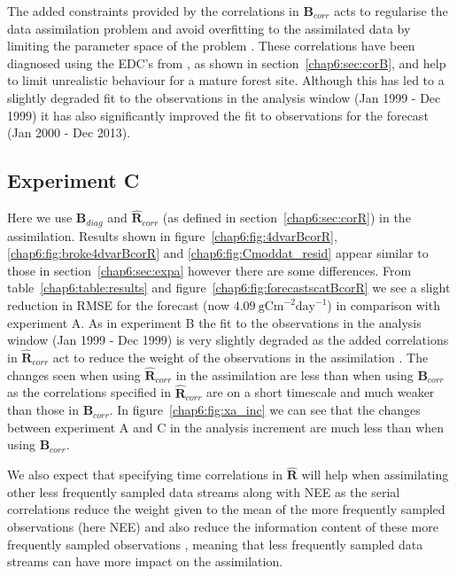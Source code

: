 The added constraints provided by the correlations in $\textbf{B}_{corr}$ acts to regularise the data assimilation problem and avoid overfitting to the assimilated data by limiting the parameter space of the problem \citep{smith2009variational}. These correlations have been diagnosed using the EDC's from \citet{Bloom2015}, as shown in section~\ref{chap6:sec:corB}, and help to limit unrealistic behaviour for a mature forest site. Although this has led to a slightly degraded fit to the observations in the analysis window (Jan 1999 - Dec 1999) it has also significantly improved the fit to observations for the forecast (Jan 2000 - Dec 2013).

\subsection{Experiment C} \label{chap6:sec:expc}

Here we use $\textbf{B}_{diag}$ and $\hat{\textbf{R}}_{corr}$ (as defined in section~\ref{chap6:sec:corR}) in the assimilation. Results shown in figure~\ref{chap6:fig:4dvarBcorR}, \ref{chap6:fig:broke4dvarBcorR} and \ref{chap6:fig:Cmoddat_resid} appear similar to those in section~\ref{chap6:sec:expa} however there are some differences. From table~\ref{chap6:table:results} and figure~\ref{chap6:fig:forecastscatBcorR} we see a slight reduction in RMSE for the forecast (now $4.09 ~\text{gCm}^{-2}\text{day}^{-1}$) in comparison with experiment A. As in experiment B the fit to the observations in the analysis window (Jan 1999 - Dec 1999) is very slightly degraded as the added correlations in $\hat{\textbf{R}}_{corr}$ act to reduce the weight of the observations in the assimilation \citep{jarvinen1999variational}. The changes seen when using $\hat{\textbf{R}}_{corr}$ in the assimilation are less than when using $\textbf{B}_{corr}$ as the correlations specified in $\hat{\textbf{R}}_{corr}$ are on a short timescale and much weaker than those in $\textbf{B}_{corr}$. In figure~\ref{chap6:fig:xa_inc} we can see that the changes between experiment A and C in the analysis increment are much less than when using $\textbf{B}_{corr}$.  

We also expect that specifying time correlations in $\hat{\textbf{R}}$ will help when assimilating other less frequently sampled data streams along with NEE as the serial correlations reduce the weight given to the mean of the more frequently sampled observations (here NEE) and also reduce the information content of these more frequently sampled observations \citep{jarvinen1999variational, Daley1992}, meaning that less frequently sampled data streams can have more impact on the assimilation.

